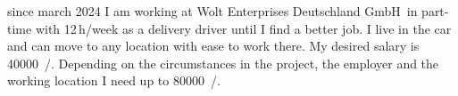 \versionLanguageStart%
		since march 2024 I am working at \glqq Wolt Enterprises Deutschland GmbH\grqq\ in part-time with 12\,h/week as a delivery driver until I find a better job.
		I live in the car and can move to any location with ease to work there.
		My desired salary is \SI{40000}{\sieuro/\year}.
		Depending on the circumstances in the project, the employer and the working location I need up to \SI{80000}{\sieuro/\year}.
\versionLanguageEnd